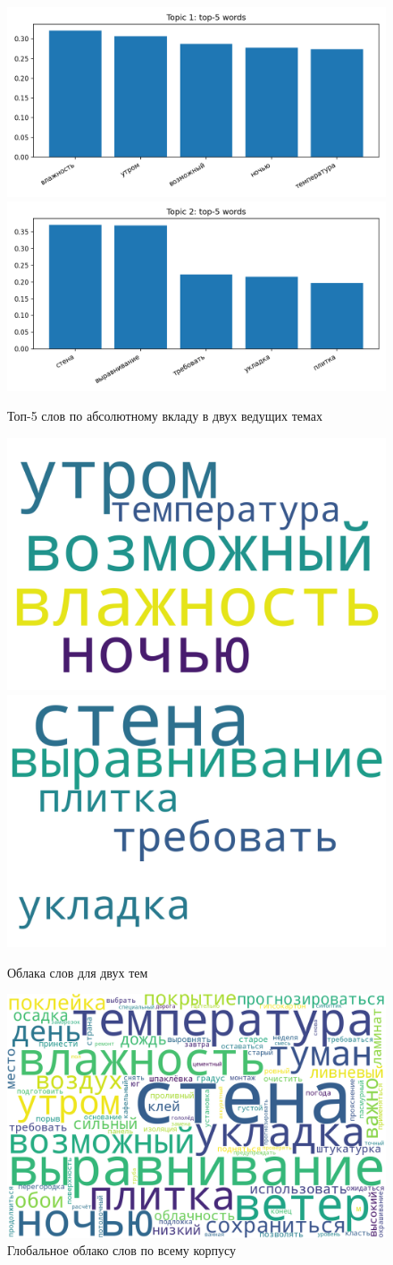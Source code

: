 \begin{figure}[h!]
  \centering
  \includegraphics[width=0.48\linewidth]{images/task2/topic1_top_words.png}\hfill
  \includegraphics[width=0.48\linewidth]{images/task2/topic2_top_words.png}
  \caption{Топ-5 слов по абсолютному вкладу в двух ведущих темах}
  \label{fig:lsa-topwords}
\end{figure}

\begin{figure}[h!]
  \centering
  \includegraphics[width=0.48\linewidth]{images/task2/topic1_wordcloud.png}\hfill
  \includegraphics[width=0.48\linewidth]{images/task2/topic2_wordcloud.png}
  \caption{Облака слов для двух тем}
  \label{fig:lsa-wordcloud}
\end{figure}

\begin{figure}[h!]
  \centering
  \includegraphics[width=0.7\linewidth]{images/task2/global_wordcloud.png}
  \caption{Глобальное облако слов по всему корпусу}
  \label{fig:lsa-global-wordcloud}
\end{figure}

